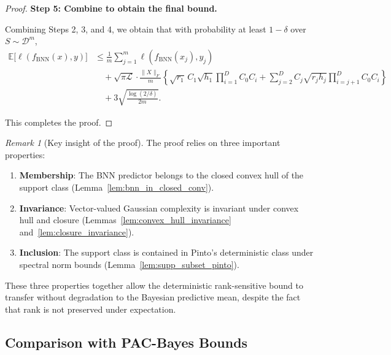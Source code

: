 \documentclass{article}
\theoremstyle{plain}
\theoremstyle{definition}
\theoremstyle{remark}
\newtheorem{remark}[theorem]{Remark}
\begin{document}
\begin{proof}
\textbf{Step 5: Combine to obtain the final bound.}

Combining Steps 2, 3, and 4, we obtain that with probability at least $1-\delta$ over $S\sim\mathcal{D}^m$,
\begin{align*}
\mathbb{E}\big[\ell(f_{\mathrm{BNN}}(x),y)\big]
&\le
\frac{1}{m}\sum_{j=1}^m \ell(f_{\mathrm{BNN}}(x_j),y_j) \\
&\quad +
\sqrt{\pi\mathcal{L}}\cdot\frac{\|X\|_F}{m}
\left\{
\sqrt{r_1}\,C_1\sqrt{h_1}\prod_{i=1}^D C_0 C_i
+
\sum_{j=2}^D C_j\sqrt{r_j h_j}\prod_{i=j+1}^D C_0 C_i
\right\} \\
&\quad +
3\sqrt{\frac{\log(2/\delta)}{2m}}.
\end{align*}

This completes the proof.
\end{proof}

\begin{remark}[Key insight of the proof]
The proof relies on three important properties:
\begin{enumerate}
    \item \textbf{Membership}: The BNN predictor belongs to the closed convex hull of the support class (Lemma~\ref{lem:bnn_in_closed_conv}).
    
    \item \textbf{Invariance}: Vector-valued Gaussian complexity is invariant under convex hull and closure (Lemmas~\ref{lem:convex_hull_invariance} and~\ref{lem:closure_invariance}).
    
    \item \textbf{Inclusion}: The support class is contained in Pinto's deterministic class under spectral norm bounds (Lemma~\ref{lem:supp_subset_pinto}).
\end{enumerate}
These three properties together allow the deterministic rank-sensitive bound to transfer without degradation to the Bayesian predictive mean, despite the fact that rank is not preserved under expectation.
\end{remark}


\subsection{Comparison with PAC-Bayes Bounds}\label{app:gaussian_complexity:comparison}
\end{document}

